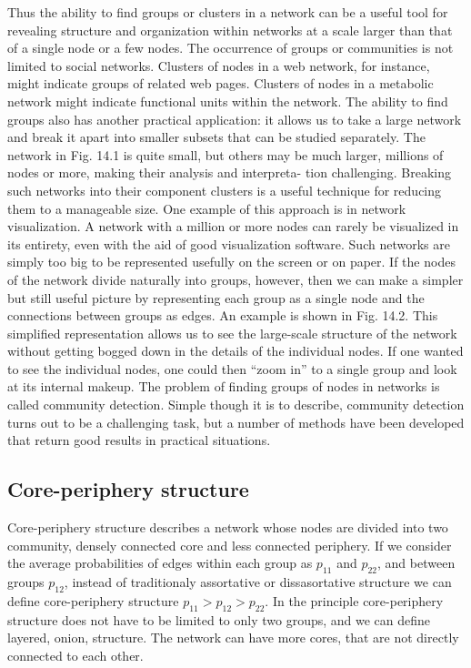 Thus the ability to find groups or clusters in a network can be a useful tool for revealing structure and organization within networks at a scale larger than that of a single node or a
few nodes. The occurrence of groups or communities is not limited to social networks.
Clusters of nodes in a web network, for instance, might indicate groups of
related web pages. Clusters of nodes in a metabolic network might indicate
functional units within the network. The ability to find groups also has another practical application: it allows
us to take a large network and break it apart into smaller subsets that can be
studied separately. The network in Fig. 14.1 is quite small, but others may be
much larger, millions of nodes or more, making their analysis and interpreta-
tion challenging. Breaking such networks into their component clusters is a
useful technique for reducing them to a manageable size. One example of this
approach is in network visualization. A network with a million or more nodes
can rarely be visualized in its entirety, even with the aid of good visualization
software. Such networks are simply too big to be represented usefully on the
screen or on paper. If the nodes of the network divide naturally into groups,
however, then we can make a simpler but still useful picture by representing
each group as a single node and the connections between groups as edges.
An example is shown in Fig. 14.2. This simplified representation allows us to
see the large-scale structure of the network without getting bogged down in
the details of the individual nodes. If one wanted to see the individual nodes,
one could then “zoom in” to a single group and look at its internal makeup. The problem of finding groups of nodes in networks is called community
detection. Simple though it is to describe, community detection turns out to be
a challenging task, but a number of methods have been developed that return
good results in practical situations.


\subsection{Core-periphery structure}

Core-periphery structure describes a network whose nodes are divided into two community, densely connected core and less connected periphery. If we consider the average probabilities of edges within each group as $p_{11}$ and $p_{22}$, and between groups $p_{12}$, instead of traditionaly assortative or dissasortative structure we can define core-periphery structure $p_{11}> p_{12} > p_{22}$. In the principle core-periphery structure does not have to be limited to only two groups, and we can define layered, onion, structure. The network can have more cores, that are not directly connected to each other. 

